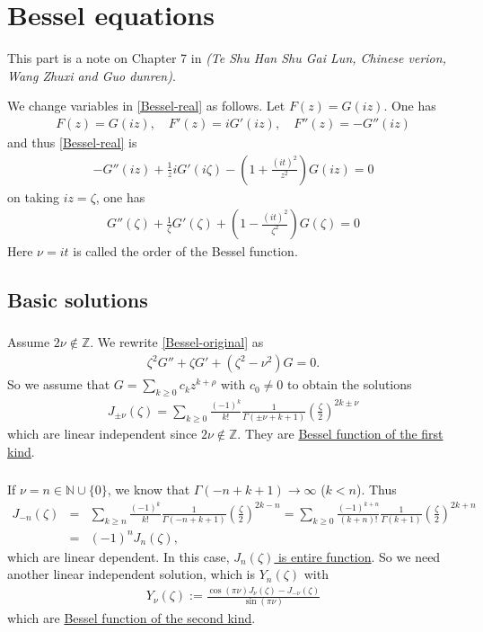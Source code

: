 \documentclass[11pt,reqno]{amsart}
\newcommand{\bea}{\begin{eqnarray}}
\newcommand{\eea}{\end{eqnarray}}
\newcommand{\bna}{\begin{eqnarray*}}
\newcommand{\ena}{\end{eqnarray*}}
\def\Z{\mathbb{Z}}
\theoremstyle{definition}
\begin{document}
\newpage

\appendix
\section{Bessel equations}\label{appendix-Bessel-equ}
This part is a note on Chapter 7 in {\it
(Te Shu Han Shu Gai Lun, Chinese verion, Wang Zhuxi and Guo dunren)}.


We change variables in \eqref{Bessel-real} as follows.
Let $F(z)=G(iz)$.
One has
\bna
F(z)=G(i z),\quad   F'(z)=iG'(i z), \quad F''(z)=-G''(i z)
\ena and thus \eqref{Bessel-real} is
\bna
-G''(i z)+\frac{1}{z}iG'(i\zeta)-\left(1+\frac{(it)^2}{z^2}\right)G(iz)=0
\ena
on taking $iz=\zeta$, one has
\bea
G''(\zeta)+\frac{1}{\zeta}G'(\zeta)+\left(1-\frac{(it)^2}{\zeta^2}\right)G(\zeta)=0
\label{Bessel-original}
\eea
Here $\nu=it$ is called the order of the Bessel function.

\subsection{Basic solutions}
\subsubsection{}

Assume $2\nu\notin\Z$. We rewrite \eqref{Bessel-original} as
\bna
\zeta^2 G''+\zeta G'+(\zeta^2-\nu^2)G=0.
\ena
So we assume that $G=\sum_{k\geq 0} c_k z^{k+\rho}$ with $c_0\neq 0$ to obtain
the solutions
\bna
J_{\pm\nu}(\zeta)=\sum_{k\geq 0}\frac{(-1)^k}{k!}\frac{1}{\Gamma(\pm\nu+k+1)}
\left(\frac{\zeta}{2}\right)^{2k\pm\nu}
\ena
which are linear independent since $2\nu\notin\Z$.
They are  \underline{Bessel function of the  first kind}.
\subsubsection{}If $\nu=n\in \mathbb N\cup\{0\}$,
we know that $\Gamma(-n+k+1)\rightarrow\infty$ ($k<n$).
Thus
\bna
J_{-n}(\zeta)&=&\sum_{k\geq n}
\frac{(-1)^k}{k!}\frac{1}{\Gamma(-n+k+1)}
\left(\frac{\zeta}{2}\right)^{2k-n}
=\sum_{k\geq 0}
\frac{(-1)^{k+n}}{(k+n)!}\frac{1}{\Gamma(k+1)}
\left(\frac{\zeta}{2}\right)^{2k+n}\\
&=&(-1)^nJ_{n}(\zeta),
\ena
which are linear dependent. In this case, \underline{$J_n(\zeta)$ is entire function}.
So we need another linear independent solution, which is  $Y_n(\zeta)$ with
\bna
Y_\nu(\zeta):=\frac{\cos(\pi\nu) J_\nu(\zeta)-J_{-\nu}(
\zeta)}{\sin (\pi\nu)}
\ena
which are \underline{Bessel function of the second kind}.
\end{document}
